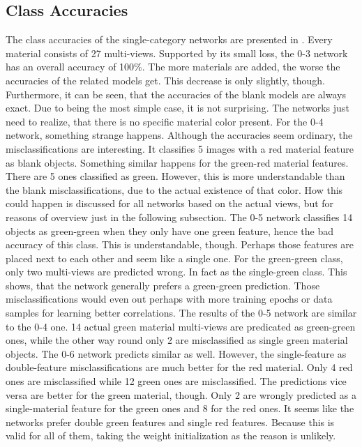 \subsection{Class Accuracies}
\label{sec:predictions-accuracies}
The class accuracies of the single-category networks are presented in .
Every material consists of 27 multi-views.
Supported by its small loss, the 0-3 network has an overall accuracy of 100\%.
The more materials are added, the worse the accuracies of the related models get.
This decrease is only slightly, though.
Furthermore, it can be seen, that the accuracies of the blank models are always exact.
Due to being the most simple case, it is not surprising.
The networks just need to realize, that there is no specific material color present.
For the 0-4 network, something strange happens.
Although the accuracies seem ordinary, the misclassifications are interesting.
It classifies 5 images with a red material feature as blank objects.
Something similar happens for the green-red material features.
There are 5 ones classified as green.
However, this is more understandable than the blank misclassifications, due to the actual existence of that color.
How this could happen is discussed for all networks based on the actual views, but for reasons of overview just in the following subsection.
The 0-5 network classifies 14 objects as green-green when they only have one green feature, hence the bad accuracy of this class.
This is understandable, though.
Perhaps those features are placed next to each other and seem like a single one.
For the green-green class, only two multi-views are predicted wrong.
In fact as the single-green class.
This shows, that the network generally prefers a green-green prediction.
Those misclassifications would even out perhaps with more training epochs or data samples for learning better correlations.
The results of the 0-5 network are similar to the 0-4 one.
14 actual green material multi-views are predicated as green-green ones, while the other way round only 2 are misclassified as single green material objects.
The 0-6 network predicts similar as well.
However, the single-feature as double-feature misclassifications are much better for the red material.
Only 4 red ones are misclassified while 12 green ones are misclassified.
The predictions vice versa are better for the green material, though.
Only 2 are wrongly predicted as a single-material feature for the green ones and 8 for the red ones.
It seems like the networks prefer double green features and single red features.
Because this is valid for all of them, taking the weight initialization as the reason is unlikely.
